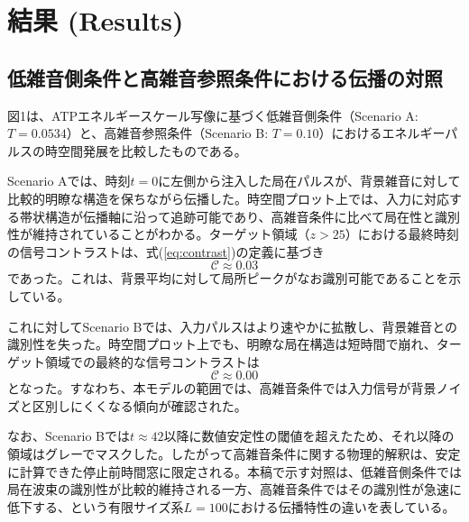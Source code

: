 \documentclass[a4paper,11pt,ja=standard,lualatex]{bxjsarticle}
\begin{document}
\FloatBarrier

\section{結果 (Results)}
\label{sec:results}

\subsection{低雑音側条件と高雑音参照条件における伝播の対照}
図1は、ATPエネルギースケール写像に基づく低雑音側条件（Scenario A: $T=0.0534$）と、高雑音参照条件（Scenario B: $T=0.10$）におけるエネルギーパルスの時空間発展を比較したものである。

Scenario Aでは、時刻$t=0$に左側から注入した局在パルスが、背景雑音に対して比較的明瞭な構造を保ちながら伝播した。時空間プロット上では、入力に対応する帯状構造が伝播軸に沿って追跡可能であり、高雑音条件に比べて局在性と識別性が維持されていることがわかる。ターゲット領域（$z>25$）における最終時刻の信号コントラストは、式(\ref{eq:contrast})の定義に基づき
\begin{equation}
\mathcal{C} \approx 0.03
\end{equation}
であった。これは、背景平均に対して局所ピークがなお識別可能であることを示している。

これに対してScenario Bでは、入力パルスはより速やかに拡散し、背景雑音との識別性を失った。時空間プロット上でも、明瞭な局在構造は短時間で崩れ、ターゲット領域での最終的な信号コントラストは
\begin{equation}
\mathcal{C} \approx 0.00
\end{equation}
となった。すなわち、本モデルの範囲では、高雑音条件では入力信号が背景ノイズと区別しにくくなる傾向が確認された。

なお、Scenario Bでは$t \approx 42$以降に数値安定性の閾値を超えたため、それ以降の領域はグレーでマスクした。したがって高雑音条件に関する物理的解釈は、安定に計算できた停止前時間窓に限定される。本稿で示す対照は、低雑音側条件では局在波束の識別性が比較的維持される一方、高雑音条件ではその識別性が急速に低下する、という有限サイズ系$L=100$における伝播特性の違いを表している。
\end{document}
